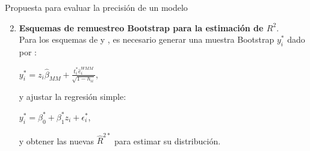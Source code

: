 \documentclass[serif, aspectratio=169]{beamer}
\begin{document}
\begin{frame}{Propuesta para evaluar la precisión de un modelo}
	
	\begin{enumerate}
		\setcounter{enumi}{1}
		\item {\large \textbf{Esquemas de remuestreo Bootstrap para la estimación de $R^{2}$}.}\\
		
		Para los esquemas de \textcite{wu-1986} y \textcite{liu-1988}, es necesario generar una muestra Bootstrap $y^{*}_{i}$ dado por :
		
		\begin{center}
			{\large$y^{*}_{i} =z_{i}\hat{\beta}_{MM} + \frac{t^{*}_{i}\hat{e}^{WMM}_{i}}{\sqrt{1-h_{ii}}} $},
		\end{center}
		
		y ajustar la regresión simple:
		 \begin{center}
		 	$y^{*}_{i} = \beta_0^{*} + \beta_1^{*} z_i + \epsilon_i^{*} $,
		 \end{center}
		 
		 y obtener las nuevas $\hat{R}^{2*}$ para estimar su distribución.
		
	\end{enumerate}
	
\end{frame}
\end{document}
